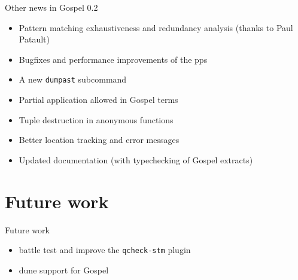 \documentclass[pdf]{beamer}
\begin{document}
\begin{frame}{Other news in Gospel 0.2}

  \begin{itemize}
    \item Pattern matching exhaustiveness and redundancy analysis (thanks to Paul Patault)
    \item Bugfixes and performance improvements of the pps
    \item A new \texttt{dumpast} subcommand
    \item Partial application allowed in Gospel terms
    \item Tuple destruction in anonymous functions
    \item Better location tracking and error messages
    \item Updated documentation (with typechecking of Gospel extracts)
  \end{itemize}

\end{frame}

\section{Future work}

\begin{frame}{Future work}

  \begin{itemize}
    \item battle test and improve the \texttt{qcheck-stm} plugin
    \item dune support for Gospel
  \end{itemize}

\end{frame}
\end{document}
